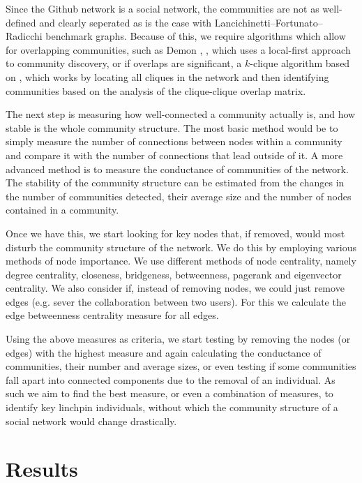 \documentclass[9pt,twocolumn,twoside]{pnas-new}
\begin{document}
Since the Github network is a social network, the communities are not as well-defined and clearly seperated as is the case with Lancichinetti–Fortunato–Radicchi benchmark graphs.
Because of this, we require algorithms which allow for overlapping communities, 
such as Demon \cite{Demon}, \cite{coscia-rossetti}, which uses a local-first approach to community discovery, or if overlaps are significant,
a $k$-clique algorithm based on \cite{palla-derenyi}, which works by locating all cliques in the network and then identifying communities based on the analysis of the clique-clique overlap matrix.

The next step is measuring how well-connected a community actually is, and how stable is the whole community structure. 
The most basic method would be to simply measure the number of connections between nodes within a community and compare it with the number of connections that lead outside of it.
A more advanced method is to measure the conductance \cite{leskovec-lang-mahoney} of communities of the network.
The stability of the community structure can be estimated from the changes in the number of communities detected, their average size and the number of nodes contained in a community.

Once we have this, we start looking for key nodes that, if removed, would most disturb the community structure of the network.
We do this by employing various methods of node importance.
We use different methods of node centrality, namely degree centrality, closeness, bridgeness, betweenness, pagerank and eigenvector centrality.
We also consider if, instead of removing nodes, we could just remove edges (e.g. sever the collaboration between two users).
For this we calculate the edge betweenness centrality measure for all edges.

Using the above measures as criteria, we start testing by removing the nodes (or edges) with the highest measure and 
again calculating the conductance of communities, their number and average sizes,
or even testing if some communities fall apart into connected components due to the removal of an individual.
As such we aim to find the best measure, or even a combination of measures, to identify key linchpin individuals, 
without which the community structure of a social network would change drastically.

\section*{Results}
\end{document}
